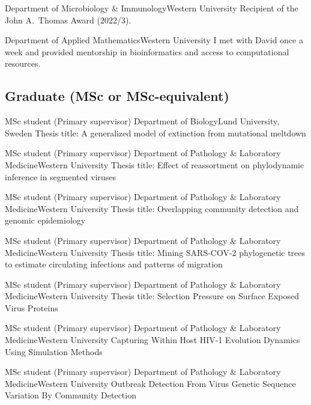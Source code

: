 {Department of Microbiology \& Immunology}{Western University}
{Recipient of the John A.~Thomas Award (2022/3).}

{Department of Applied Mathematics}{Western University}
{I met with David once a week and provided mentorship in bioinformatics and access to computational resources.}



\subsection {Graduate (MSc or MSc-equivalent)}

{MSc student (Primary supervisor)}
{Department of Biology}{Lund University, Sweden}
{Thesis title: A generalized model of extinction from mutational meltdown}

{MSc student (Primary supervisor)}
{Department of Pathology \& Laboratory Medicine}{Western University}
{Thesis title: Effect of reassortment on phylodynamic inference in segmented viruses}

{MSc student (Primary supervisor)}
{Department of Pathology \& Laboratory Medicine}{Western University}
{Thesis title: Overlapping community detection and genomic epidemiology}

{MSc student (Primary supervisor)}
{Department of Pathology \& Laboratory Medicine}{Western University}
{Thesis title: Mining SARS-COV-2 phylogenetic trees to estimate circulating infections and patterns of migration}

{MSc student (Primary supervisor)}
{Department of Pathology \& Laboratory Medicine}{Western University}
{Thesis title: Selection Pressure on Surface Exposed Virus Proteins}

{MSc student (Primary supervisor)}
{Department of Pathology \& Laboratory Medicine}{Western University}
{Capturing Within Host HIV-1 Evolution Dynamics Using Simulation Methods}

{MSc student (Primary supervisor)}
{Department of Pathology \& Laboratory Medicine}{Western University}
{Outbreak Detection From Virus Genetic Sequence Variation By Community Detection}

